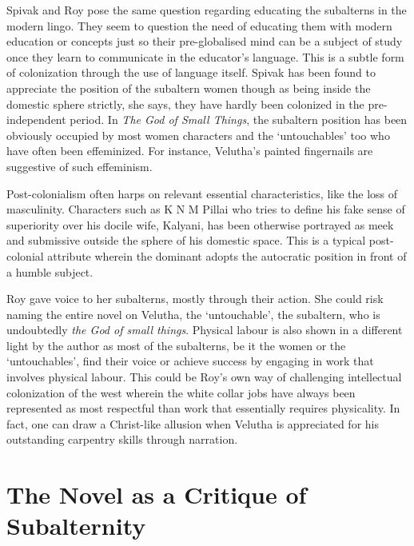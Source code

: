 Spivak and Roy pose the same question regarding educating the subalterns in the modern lingo. They seem to question the need of educating them with modern education or concepts just so their pre-globalised mind can be a subject of study once they learn to communicate in the educator’s language. This is a subtle form of colonization through the use of language itself. Spivak has been found to appreciate the position of the subaltern women though as being inside the domestic sphere strictly, she says, they have hardly been colonized in the pre-independent period. In \emph{The God of Small Things}, the subaltern position has been obviously occupied by most women characters and the ‘untouchables’ too who have often been effeminized. For instance, Velutha’s painted fingernails are suggestive of such effeminism. 

Post-colonialism often harps on relevant essential characteristics, like the loss of masculinity. Characters such as K N M Pillai who tries to define his fake sense of superiority over his docile wife, Kalyani, has been otherwise portrayed as meek and submissive outside the sphere of his domestic space. This is a typical post-colonial attribute wherein the dominant adopts the autocratic position in front of a humble subject.  

Roy gave voice to her subalterns, mostly through their action. She could risk naming the entire novel on Velutha, the ‘untouchable’, the subaltern, who is undoubtedly \emph{the God of small things}. Physical labour is also shown in a different light by the author as most of the subalterns, be it the women or the ‘untouchables’, find their voice or achieve success by engaging in work that involves physical labour. This could be Roy’s own way of challenging intellectual colonization of the west wherein the white collar jobs have always been represented as most respectful than work that essentially requires physicality. In fact, one can draw a Christ-like allusion when Velutha is appreciated for his outstanding carpentry skills through narration.

\section{The Novel as a Critique of Subalternity}

